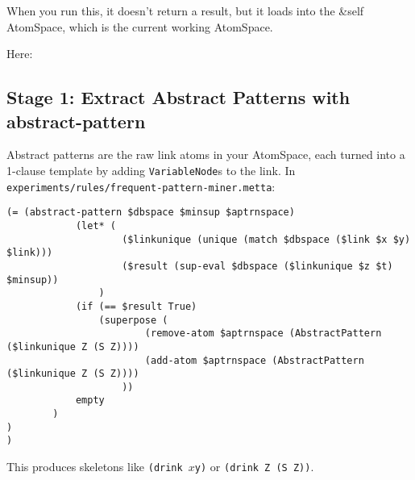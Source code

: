 \documentclass{article}
\begin{document}
When you run this, it doesn't return a result, but it loads into the &self AtomSpace, which is the current working AtomSpace.

Here:\\


\subsection{Stage 1: Extract Abstract Patterns with abstract-pattern}

Abstract patterns are the raw link atoms in your AtomSpace, each turned into a 1-clause template by adding \texttt{VariableNode}s to the link.  In \texttt{experiments/rules/frequent-pattern-miner.metta}:

\begin{verbatim}
(= (abstract-pattern $dbspace $minsup $aptrnspace)
            (let* (
                    ($linkunique (unique (match $dbspace ($link $x $y) $link)))
                    ($result (sup-eval $dbspace ($linkunique $z $t) $minsup))
                )
            (if (== $result True)
                (superpose (
                        (remove-atom $aptrnspace (AbstractPattern ($linkunique Z (S Z))))
                        (add-atom $aptrnspace (AbstractPattern ($linkunique Z (S Z))))
                    ))
            empty
        )
)
)
\end{verbatim}

This produces skeletons like \texttt{(drink $x $y)} or \texttt{(drink Z (S Z))}.
\end{document}
